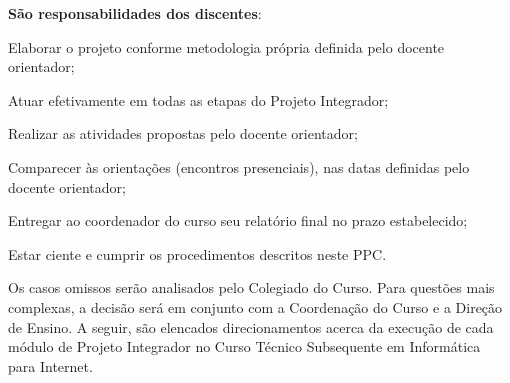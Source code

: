 \documentclass[
	12pt,				%
	openright,			%
	twoside,			%
	a4paper,			%
	chapter=TITLE,		%
	english,			%
	french,				%
	spanish,			%
	brazil,				%
	]{abntex2}
\begin{document}
\textbf{São responsabilidades dos discentes}:
\begin{alineas}
    \item Elaborar o projeto conforme metodologia própria definida pelo docente orientador;
    \item Atuar efetivamente em todas as etapas do Projeto Integrador;
    \item Realizar as atividades propostas pelo docente orientador;
    \item Comparecer às orientações (encontros presenciais), nas datas definidas pelo docente orientador;
    \item  Entregar ao coordenador do curso seu relatório final no prazo estabelecido;
    \item  Estar ciente e cumprir os procedimentos descritos neste PPC.
\end{alineas}



Os casos omissos serão analisados pelo Colegiado do Curso. Para questões mais complexas, a decisão será em conjunto com a Coordenação do Curso e a Direção de Ensino. A seguir, são elencados direcionamentos acerca da execução de cada módulo de Projeto Integrador no Curso Técnico Subsequente em Informática para Internet.
\end{document}
